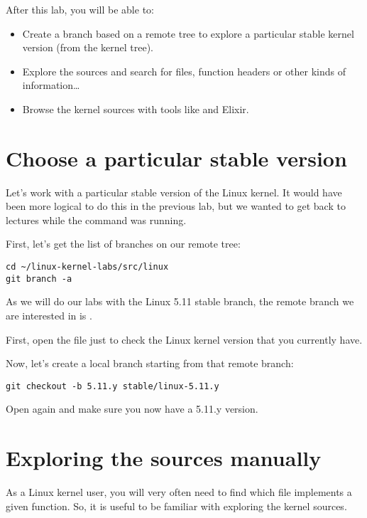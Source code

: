 
After this lab, you will be able to:

\begin{itemize}

\item Create a branch based on a remote tree to explore a particular
      stable kernel version (from the  kernel tree).
\item Explore the sources and search for files, function headers or
  other kinds of information\ldots
\item Browse the kernel sources with tools like  and Elixir.
\end{itemize}

\section{Choose a particular stable version}

Let's work with a particular stable version of the Linux kernel.
It would have been more logical to do this in the previous lab, but we
wanted to get back to lectures while the  command was
running.

First, let's get the list of branches on our  remote tree:

\begin{verbatim}
cd ~/linux-kernel-labs/src/linux
git branch -a
\end{verbatim}

As we will do our labs with the Linux 5.11 stable branch, the remote branch
we are interested in is .

First, open the  file just to check the Linux kernel
version that you currently have.

Now, let's create a local branch starting from that remote branch:
\begin{verbatim}
git checkout -b 5.11.y stable/linux-5.11.y
\end{verbatim}

Open  again and make sure you now have a 5.11.y version.

\section{Exploring the sources manually}

As a Linux kernel user, you will very often need to find which file
implements a given function. So, it is useful to be familiar with
exploring the kernel sources.

